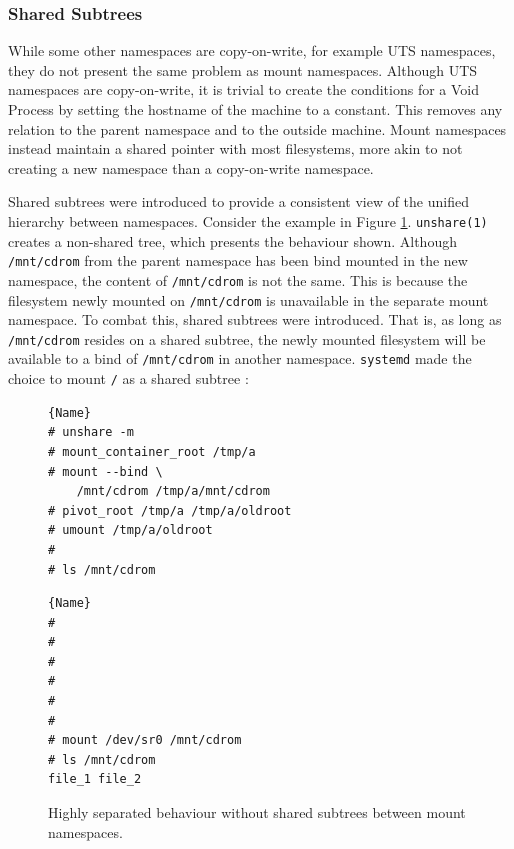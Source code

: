 \documentclass[sigplan]{acmart}
\begin{document}
\subsubsection{Shared Subtrees}

While some other namespaces are copy-on-write, for example UTS namespaces, they do not present the same problem as mount namespaces. Although UTS namespaces are copy-on-write, it is trivial to create the conditions for a Void Process by setting the hostname of the machine to a constant. This removes any relation to the parent namespace and to the outside machine. Mount namespaces instead maintain a shared pointer with most filesystems, more akin to not creating a new namespace than a copy-on-write namespace.

Shared subtrees \citep{pai_shared_2005} were introduced to provide a consistent view of the unified hierarchy between namespaces. Consider the example in Figure \ref{fig:shared-subtrees}. \texttt{unshare(1)} creates a non-shared tree, which presents the behaviour shown. Although \texttt{/mnt/cdrom} from the parent namespace has been bind mounted in the new namespace, the content of \texttt{/mnt/cdrom} is not the same. This is because the filesystem newly mounted on \texttt{/mnt/cdrom} is unavailable in the separate mount namespace. To combat this, shared subtrees were introduced. That is, as long as \texttt{/mnt/cdrom} resides on a shared subtree, the newly mounted filesystem will be available to a bind of \texttt{/mnt/cdrom} in another namespace. \texttt{systemd} made the choice to mount \texttt{/} as a shared subtree \citep{free_software_foundation_mount_namespaces7_2021}:

\begin{figure}
\begin{minipage}{.45\textwidth}

\begin{lstlisting}[frame=tlrb,showlines=true]{Name}
# unshare -m
# mount_container_root /tmp/a
# mount --bind \
    /mnt/cdrom /tmp/a/mnt/cdrom
# pivot_root /tmp/a /tmp/a/oldroot
# umount /tmp/a/oldroot
#
# ls /mnt/cdrom

\end{lstlisting}

\end{minipage}\hfill
\begin{minipage}{.45\textwidth}

\begin{lstlisting}[frame=tlrb]{Name}
#
#
#
#
#
#
# mount /dev/sr0 /mnt/cdrom
# ls /mnt/cdrom
file_1 file_2
\end{lstlisting}

\end{minipage}

\caption{Highly separated behaviour without shared subtrees between mount namespaces.}
\label{fig:shared-subtrees}
\end{figure}
\end{document}
